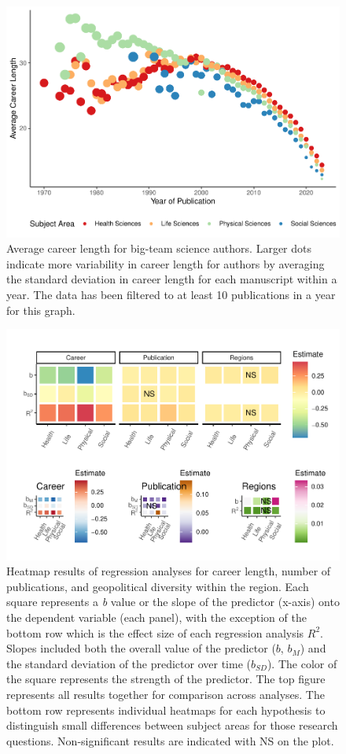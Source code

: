 \documentclass[
  man,floatsintext]{apa6}
\begin{document}
\begin{figure}
\centering
\includegraphics{manuscript_scopus_files/figure-latex/fig-career-1.pdf}
\caption{\label{fig:fig-career}Average career length for big-team science authors. Larger dots indicate more variability in career length for authors by averaging the standard deviation in career length for each manuscript within a year. The data has been filtered to at least 10 publications in a year for this graph.}
\end{figure}

\begin{figure}
\centering
\includegraphics{manuscript_scopus_files/figure-latex/fig-heatmap-1.pdf}
\caption{\label{fig:fig-heatmap}Heatmap results of regression analyses for career length, number of publications, and geopolitical diversity within the region. Each square represents a \emph{b} value or the slope of the predictor (x-axis) onto the dependent variable (each panel), with the exception of the bottom row which is the effect size of each regression analysis \(R^2\). Slopes included both the overall value of the predictor (\(b\), \(b_M\)) and the standard deviation of the predictor over time (\(b_{SD}\)). The color of the square represents the strength of the predictor. The top figure represents all results together for comparison across analyses. The bottom row represents individual heatmaps for each hypothesis to distinguish small differences between subject areas for those research questions. Non-significant results are indicated with NS on the plot.}
\end{figure}
\end{document}
